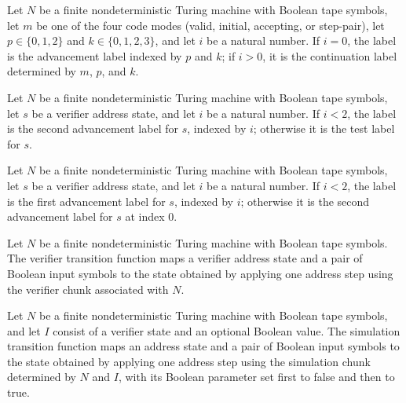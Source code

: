 \begin{definition}
\label{Complexity.Codec.prAdvL}
\leanok
{}
Let $N$ be a finite nondeterministic Turing machine with Boolean tape symbols, let $m$
be one of the four code modes (valid, initial, accepting, or step-pair), let
$p\in\{0,1,2\}$ and $k\in\{0,1,2,3\}$, and let $i$ be a natural number. If $i=0$, the
label is the advancement label indexed by $p$ and $k$; if $i>0$, it is the continuation
label determined by $m$, $p$, and $k$.
\end{definition}

\begin{definition}
\label{Complexity.Codec.vA2}
\leanok
{}
Let $N$ be a finite nondeterministic Turing machine with Boolean tape symbols, let $s$
be a verifier address state, and let $i$ be a natural number. If $i<2$, the label is the
second advancement label for $s$, indexed by $i$; otherwise it is the test label for
$s$.
\end{definition}

\begin{definition}
\label{Complexity.Codec.vA1}
\leanok
{}
Let $N$ be a finite nondeterministic Turing machine with Boolean tape symbols, let $s$
be a verifier address state, and let $i$ be a natural number. If $i<2$, the label is the
first advancement label for $s$, indexed by $i$; otherwise it is the second advancement
label for $s$ at index $0$.
\end{definition}

\begin{definition}
\leanok
{}
Let $N$ be a finite nondeterministic Turing machine with Boolean tape symbols. The
verifier transition function maps a verifier address state and a pair of Boolean input
symbols to the state obtained by applying one address step using the verifier chunk
associated with $N$.
\end{definition}

\begin{definition}
\leanok
{}
Let $N$ be a finite nondeterministic Turing machine with Boolean tape symbols, and let
$I$ consist of a verifier state and an optional Boolean value. The simulation transition
function maps an address state and a pair of Boolean input symbols to the state obtained
by applying one address step using the simulation chunk determined by $N$ and $I$, with
its Boolean parameter set first to false and then to true.
\end{definition}


